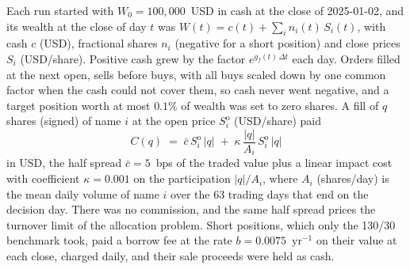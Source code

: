 Each run started with $W_0 = 100{,}000$~USD in cash at the close of 2025-01-02, and its wealth at the close of day
$t$ was $W(t) = c(t) + \sum_i n_i(t)\,S_i(t)$, with cash $c$ (USD), fractional shares $n_i$ (negative for a short
position) and close prices $S_i$ (USD/share). Positive cash grew by the factor $e^{g_f(t)\,\Delta t}$ each day.
Orders filled at the next open, sells before buys, with all buys scaled down by one common factor when the cash
could not cover them, so cash never went negative, and a target position worth at most $0.1\%$ of wealth was set to
zero shares. A fill of $q$ shares (signed) of name $i$ at the open price $S^{\mathrm{o}}_i$ (USD/share) paid
\begin{equation}
  C(q) \;=\; \bar c\, S^{\mathrm{o}}_i\,|q| \;+\; \kappa\,\frac{|q|}{A_i}\,S^{\mathrm{o}}_i\,|q|
  \label{eq:cost}
\end{equation}
in USD, the half spread $\bar c = 5$~bps of the traded value plus a linear impact cost~\cite{almgrenChriss2001}
with coefficient $\kappa = 0.001$ on the participation $|q|/A_i$, where $A_i$ (shares/day) is the mean daily volume
of name $i$ over the $63$ trading days that end on the decision day. There was no commission, and the same half
spread prices the turnover limit of the allocation problem. Short positions, which only the 130/30 benchmark took,
paid a borrow fee at the rate $b = 0.0075$~$\mathrm{yr}^{-1}$ on their value at each close, charged daily, and their
sale proceeds were held as cash.

